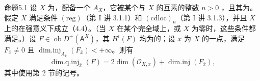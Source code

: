 \begin{SGAresult}{命题}{5.1}
设 $X$ 为，配备一个 $A_X$，它被某个与 $X$ 的互素的整数 $n>0$ ，且其为。假定 $X$ 满足条件 $\mathrm{(reg)}$（第 I 讲 3.1.1）和 $\mathrm{(cdloc)}_n$（第 I 讲 3.1.3），并且 $X$ 上的在强意义下成立（4.4）。（当 $X$ 在某个完全域上，或 $X$ 为零时，这些条件都满足。）设 $F\in\operatorname{ob}D^+(\mathsf A^X)$，其 $H^i(F)$ 均为的；设 $x$ 为 $X$ 的一点，满足 $F_{\bar x}\ne0$ 且 $\operatorname{dim.inj}_{A_{\bar x}}(F_{\bar x})<+\infty$。则有
\[
\operatorname{dim.q.inj}_{\bar x}(F)
=2\dim(\mathcal O_{X,x})+\operatorname{dim.inj}(F_{\bar x}),
\]
其中使用第 2 节的记号。
\end{SGAresult}
